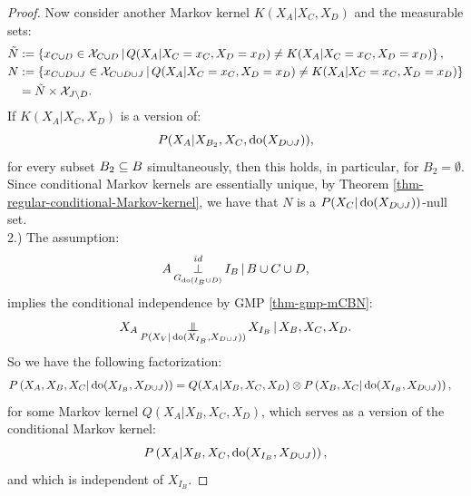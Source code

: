 \begin{Prp}
\begin{proof}
Now consider another Markov kernel $K(X_A|X_C,X_D)$ and the measurable sets:
\begin{align*}
    \tilde N &:= \left \{ x_{C \cup D} \in \mathcal{X}_{C \cup D} \,\middle|\, Q(X_A|X_C=x_C,X_D=x_D) \neq K(X_A|X_C=x_C,X_D=x_D)  \right \},\\
     N &:= \left \{ x_{C \cup D \cup J} \in \mathcal{X}_{C \cup D \cup J} \,\middle|\, Q(X_A|X_C=x_C,X_D=x_D) \neq K(X_A|X_C=x_C,X_D=x_D)  \right \} \\
       &= \tilde N \times \mathcal{X}_{J \setminus D}.
\end{align*}
If $K(X_A|X_C,X_D)$ is a version of: 
\[P(X_A|X_{B_2},X_C,\operatorname{do}(X_{D\cup J})),\] 
for every subset $B_2 \subseteq B$ simultaneously, then this holds, in particular, for $B_2 = \emptyset$.
Since conditional Markov kernels are essentially unique, by Theorem \ref{thm-regular-conditional-Markov-kernel}, we have that $N$ is a $P(X_C|\operatorname{do}(X_{D\cup J}))$-null set.
\\

2.) The assumption:
            \[ A \operatorname*{\perp}^{id}_{G_{\operatorname{do}(I_B \cup D)}} I_B \operatorname*{|} B \cup C \cup D,   \]
implies the conditional independence by GMP \ref{thm-gmp-mCBN}:
  \[ X_A \operatorname*{\perp\mkern-11mu\perp}_{P(X_V|\operatorname{do}(X_{I_B},X_{D\cup J}))} X_{I_B} \operatorname*{|} X_B,X_C,X_D.\]
So we have the following factorization:
\begin{align}
    P\left ( X_A,X_B,X_C|\operatorname{do}(X_{I_B},X_{D\cup J})\right ) &= Q(X_A|X_B,X_C,X_D) \otimes P\left ( X_B,X_C|\operatorname{do}(X_{I_B},X_{D\cup J})\right ),\label{eq:2nd-do-int-1}  
\end{align}
for some Markov kernel $Q(X_A|X_B,X_C,X_D)$, which serves as a version of the conditional Markov kernel:
  \[P\left ( X_A|X_B,X_C,\operatorname{do}(X_{I_B},X_{D\cup J})\right ),\]
and which is independent of $X_{I_B}$.


\end{proof}
\end{Prp}
